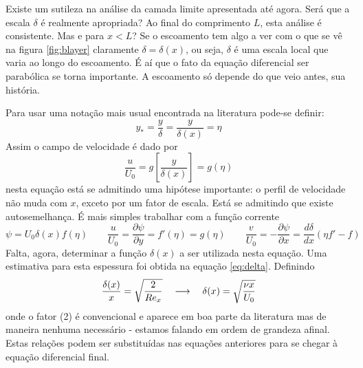 Existe um sutileza na análise da camada limite apresentada até agora. Será que a escala $\delta$ é realmente apropriada? Ao final do comprimento $L$, esta análise é consistente. Mas e para $x < L$? Se o escoamento tem algo a ver com o que se vê na figura \ref{fig:blayer} claramente $\delta = \delta(x)$, ou seja, $\delta$ é uma escala local que varia ao longo do escoamento. É aí que o fato da equação diferencial ser parabólica se torna importante. A escoamento só depende do que veio antes, sua história. 

Para usar uma notação mais usual encontrada na literatura pode-se definir:
\[
y_* = \frac{y}{\delta} = \frac{y}{\delta(x)} = \eta
\]
Assim o campo de velocidade é dado por
\[
\frac{u}{U_0} = g\left[\frac{y}{\delta(x)}\right] = g(\eta)
\]
nesta equação está se admitindo uma hipótese importante: o perfil de velocidade não muda com $x$, exceto por um fator de escala. Está se admitindo que existe autosemelhança. É mais simples trabalhar com a função corrente
\[
\psi = U_0 \delta(x) f(\eta) \qquad \frac{u}{U_0} = \frac{\partial\psi}{\partial y}=f'(\eta)=g(\eta) \qquad \frac{v}{U_0} =-\frac{\partial\psi}{\partial x} = \frac{d\delta}{dx}\left(\eta f' - f\right)
\]
Falta, agora, determinar a função $\delta(x)$ a ser utilizada nesta equação. Uma estimativa para esta espessura foi obtida na equação \ref{eq:delta}. Definindo 
\begin{equation}
  \frac{\delta(x)}{x} = \sqrt{\frac{2}{Re_x}} \quad\longrightarrow\quad \delta(x) = \sqrt{\frac{\nu x}{U_0}}
  \label{eq:delta2}
\end{equation}
onde o fator (2) é convencional e aparece em boa parte da literatura mas de maneira nenhuma necessário - estamos falando em ordem de grandeza afinal. Estas relações podem ser substituídas nas equações anteriores para se chegar à equação diferencial final.

